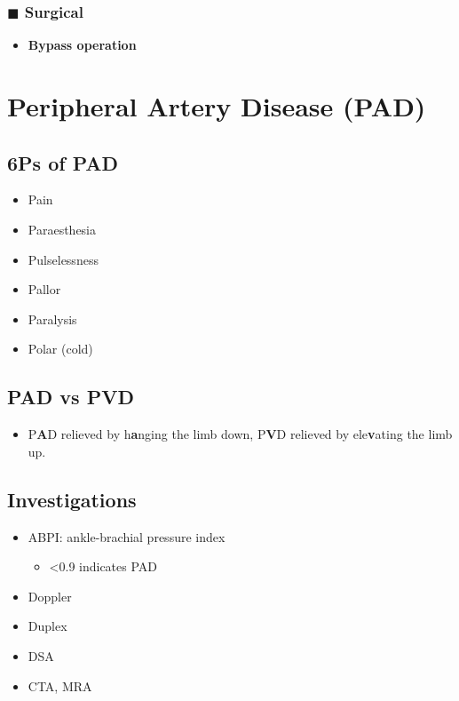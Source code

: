 \documentclass[
  12pt,
]{memoir}
\providecommand{\tightlist}{%
  \setlength{\itemsep}{0pt}\setlength{\parskip}{0pt}}
\begin{document}
\hypertarget{blacksquare-surgical}{%
\subsubsection{\texorpdfstring{\(\blacksquare\)
Surgical}{\textbackslash blacksquare Surgical}}\label{blacksquare-surgical}}

\begin{itemize}
\tightlist
\item
  \textbf{Bypass operation}
\end{itemize}

\hypertarget{peripheral-artery-disease-pad}{%
\section{Peripheral Artery Disease
(PAD)}\label{peripheral-artery-disease-pad}}

\hypertarget{ps-of-pad}{%
\subsection{6Ps of PAD}\label{ps-of-pad}}

\begin{itemize}
\tightlist
\item
  Pain
\item
  Paraesthesia
\item
  Pulselessness
\item
  Pallor
\item
  Paralysis
\item
  Polar (cold)
\end{itemize}

\hypertarget{pad-vs-pvd}{%
\subsection{PAD vs PVD}\label{pad-vs-pvd}}

\begin{itemize}
\tightlist
\item
  P\textbf{A}D relieved by h\textbf{a}nging the limb down, P\textbf{V}D
  relieved by ele\textbf{v}ating the limb up.
\end{itemize}

\hypertarget{investigations-3}{%
\subsection{Investigations}\label{investigations-3}}

\begin{itemize}
\tightlist
\item
  ABPI: ankle-brachial pressure index

  \begin{itemize}
  \tightlist
  \item
    \textless0.9 indicates PAD
  \end{itemize}
\item
  Doppler
\item
  Duplex
\item
  DSA
\item
  CTA, MRA
\end{itemize}
\end{document}
